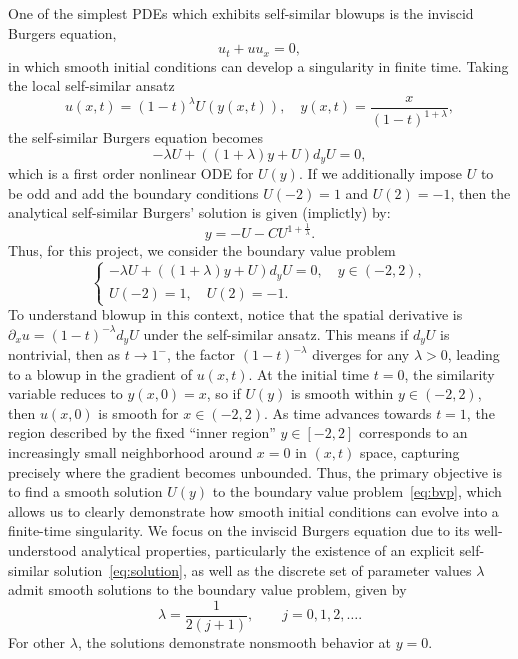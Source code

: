 \documentclass[12pt]{article}
\theoremstyle{definition}\newtheorem{lemma}{Lemma}
\begin{document}
One of the simplest PDEs which exhibits self-similar blowups is the inviscid Burgers equation,
\begin{equation}
u_t + u u_x = 0,
\end{equation}
in which smooth initial conditions can develop a singularity in finite time. Taking the local self-similar ansatz
\begin{equation}\label{eq:self-similar-ansatz}
    u(x, t) = (1-t)^\lambda U(y(x, t)), \quad y(x, t) = \frac{x}{(1-t)^{1+\lambda}},
\end{equation}
the self-similar Burgers equation becomes
\begin{equation}
    -\lambda U + ((1+\lambda)y +U)d_yU = 0,
\end{equation}
which is a first order nonlinear ODE for $U(y)$. If we additionally impose $U$ to be odd and add the boundary conditions $U(-2) = 1$ and $U(2) = -1$, then the analytical self-similar Burgers' solution is given (implictly) by:
\begin{equation}\label{eq:solution}
    y = -U - CU^{1+\tfrac{1}{\lambda}}.
\end{equation}
Thus, for this project, we consider the boundary value problem
\begin{equation}\label{eq:bvp}
    \begin{cases}
        -\lambda U + ((1+\lambda)y +U)d_yU = 0, \quad y \in (-2, 2), \\
        U(-2) = 1, \quad U(2) = -1.
    \end{cases}
\end{equation}
To understand blowup in this context, notice that the spatial derivative is $\partial_x u = (1-t)^{-\lambda} d_y U$ under the self-similar ansatz. This means if $d_y U$ is nontrivial, then as $t \to 1^-$, the factor $(1-t)^{-\lambda}$ diverges for any $\lambda > 0$, leading to a blowup in the gradient of $u(x, t)$. At the initial time $t=0$, the similarity variable reduces to $y(x, 0) = x$, so if $U(y)$ is smooth within $y \in (-2, 2)$, then $u(x, 0)$ is smooth for $x \in (-2, 2)$. As time advances towards $t = 1$, the region described by the fixed ``inner region'' $y \in [-2, 2]$ corresponds to an increasingly small neighborhood around $x = 0$ in $(x, t)$ space, capturing precisely where the gradient becomes unbounded. Thus, the primary objective is to find a smooth solution $U(y)$ to the boundary value problem~\eqref{eq:bvp}, which allows us to clearly demonstrate how smooth initial conditions can evolve into a finite-time singularity. 
We focus on the inviscid Burgers equation due to its well-understood analytical properties, particularly the existence of an explicit self-similar solution~\eqref{eq:solution}, as well as the discrete set of parameter values $\lambda$ admit smooth solutions to the boundary value problem, given by
\begin{equation}
    \lambda = \frac{1}{2(j+1)}, \qquad j = 0, 1, 2, \ldots.
\end{equation}
For other $\lambda$, the solutions demonstrate nonsmooth behavior at $y=0$.
\end{document}
